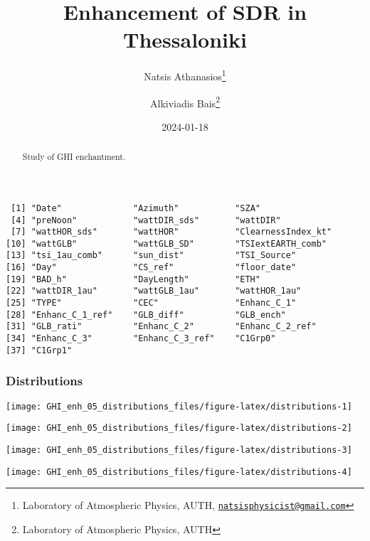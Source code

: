 \documentclass[
  10pt,
  a4paper,oneside]{article}
\title{Enhancement of SDR in Thessaloniki}
\author{Natsis Athanasios\footnote{Laboratory of Atmospheric Physics, AUTH, \href{mailto:natsisphysicist@gmail.com}{\nolinkurl{natsisphysicist@gmail.com}}} \and Alkiviadis Bais\footnote{Laboratory of Atmospheric Physics, AUTH}}
\date{2024-01-18}
\begin{document}
\maketitle
\begin{abstract}
Study of GHI enchantment.
\end{abstract}

{
\hypersetup{linkcolor=}
\setcounter{tocdepth}{4}
\tableofcontents
}
\begin{verbatim}
 [1] "Date"              "Azimuth"           "SZA"              
 [4] "preNoon"           "wattDIR_sds"       "wattDIR"          
 [7] "wattHOR_sds"       "wattHOR"           "ClearnessIndex_kt"
[10] "wattGLB"           "wattGLB_SD"        "TSIextEARTH_comb" 
[13] "tsi_1au_comb"      "sun_dist"          "TSI_Source"       
[16] "Day"               "CS_ref"            "floor_date"       
[19] "BAD_h"             "DayLength"         "ETH"              
[22] "wattDIR_1au"       "wattGLB_1au"       "wattHOR_1au"      
[25] "TYPE"              "CEC"               "Enhanc_C_1"       
[28] "Enhanc_C_1_ref"    "GLB_diff"          "GLB_ench"         
[31] "GLB_rati"          "Enhanc_C_2"        "Enhanc_C_2_ref"   
[34] "Enhanc_C_3"        "Enhanc_C_3_ref"    "C1Grp0"           
[37] "C1Grp1"           
\end{verbatim}

\newpage
\FloatBarrier

\hypertarget{distributions}{%
\subsubsection{Distributions}\label{distributions}}

\begin{center}\texttt{[image: GHI\_enh\_05\_distributions\_files/figure-latex/distributions-1]} \end{center}

\begin{center}\texttt{[image: GHI\_enh\_05\_distributions\_files/figure-latex/distributions-2]} \end{center}

\begin{center}\texttt{[image: GHI\_enh\_05\_distributions\_files/figure-latex/distributions-3]} \end{center}

\begin{center}\texttt{[image: GHI\_enh\_05\_distributions\_files/figure-latex/distributions-4]} \end{center}
\end{document}
